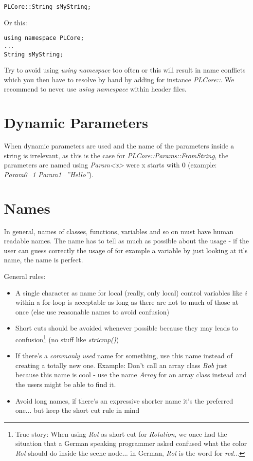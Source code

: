 \begin{lstlisting}[caption=Explicit namespace]
PLCore::String sMyString;
\end{lstlisting}

Or this:

\begin{lstlisting}[caption=Using namespace]
using namespace PLCore;
...
String sMyString;
\end{lstlisting}

Try to avoid using \emph{using namespace} too often or this will result in name conflicts which you then have to resolve by hand by adding for instance \emph{PLCore::}. We recommend to never use \emph{using namespace} within header files.




\section{Dynamic Parameters}
When dynamic parameters are used and the name of the parameters inside a string is irrelevant, as this is the case for \emph{PLCore::Params::FromString}, the parameters are named using \emph{Param<x>} were x starts with $0$ (example: \emph{Param0=1 Param1=''Hello''}).  




\section{Names}
In general, names of classes, functions, variables and so on must have human readable names. The name has to tell as much as possible about the usage - if the user can guess correctly the usage of for example a variable by just looking at it's name, the name is perfect.

General rules:

\begin{itemize}
\item A single character as name for local (really, only local) control variables like \emph{i} within a for-loop is acceptable as long as there are not to much of those at once (else use reasonable names to avoid confusion)
\item Short cuts should be avoided whenever possible because they may leads to confusion\footnote{True story: When using \emph{Rot} as short cut for \emph{Rotation}, we once had the situation that a German speaking programmer asked confused what the color \emph{Rot} should do inside the scene node... in German, \emph{Rot} is the word for \emph{red}...} (no stuff like \emph{stricmp()})
\item If there's a \emph{commonly used} name for something, use this name instead of creating a totally new one. Example: Don't call an array class \emph{Bob} just because this name is cool - use the name \emph{Array} for an array class instead and the users might be able to find it.
\item Avoid long names, if there's an expressive shorter name it's the preferred one... but keep the short cut rule in mind
\end{itemize}

